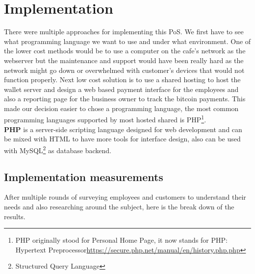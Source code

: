 \section{Implementation}
There were multiple approaches for implementing this PoS. We first have to see what programming language we want to use and under what environment. One of the lower cost methods would be to use a computer on the cafe's network as the webserver but the maintenance and support would have been really hard as the network might go down or overwhelmed with customer's devices that would not function properly. Next low cost solution is to use a shared hosting to host the wallet server and design a web based payment interface for the employees and also a reporting page for the business owner to track the bitcoin payments. This made our decision easier to chose a programming language, the most common programming languages supported by most hosted shared is PHP\footnote{PHP originally stood for Personal Home Page, it now stands for PHP: Hypertext Preprocessor\url{https://secure.php.net/manual/en/history.php.php}}. 
\\ \textbf{PHP} is a server-side scripting language designed for web development and can be mixed with HTML to have more tools for interface design, also can be used with MySQL\footnote{Structured Query Language} as database backend.

\subsection{Implementation measurements}
After multiple rounds of surveying employees and customers to understand their needs and also researching around the subject, here is the break down of the results.

